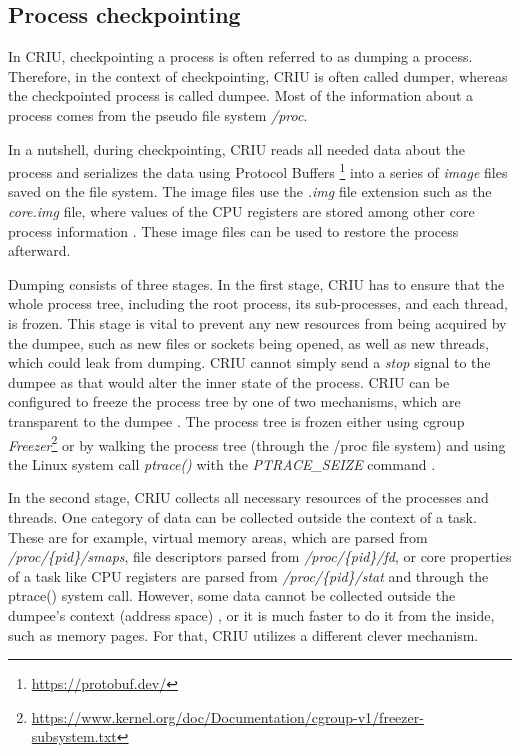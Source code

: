 \documentclass[
  digital,     %
  oneside,     %
  nosansbold,  %
  nocolorbold, %
  lof,         %
  lot,         %
]{fithesis4}
\begin{document}
\subsection{Process checkpointing}
In CRIU, checkpointing a process is often referred to as dumping a process. Therefore, in the context of checkpointing, CRIU is often called dumper, whereas the checkpointed process is called dumpee. Most of the information about a process comes from the pseudo file system \emph{/proc}. 

In a nutshell, during checkpointing, CRIU reads all needed data about the process and serializes the data using Protocol Buffers \footnote{\url{https://protobuf.dev/}} into a series of \emph{image} files saved on the file system. The image files use the \emph{.img} file extension such as the \emph{core.img} file, where values of the CPU registers are stored among other core process information \cite{criu_images}. These image files can be used to restore the process afterward. 

Dumping consists of three stages. In the first stage, CRIU has to ensure that the whole process tree, including the root process, its sub-processes, and each thread, is frozen. This stage is vital to prevent any new resources from being acquired by the dumpee, such as new files or sockets being opened, as well as new threads, which could leak from dumping. CRIU cannot simply send a \emph{stop} signal to the dumpee as that would alter the inner state of the process. CRIU can be configured to freeze the process tree by one of two mechanisms, which are transparent to the dumpee \cite{criu_freezing}. The process tree is frozen either using cgroup \emph{Freezer}\footnote{\url{https://www.kernel.org/doc/Documentation/cgroup-v1/freezer-subsystem.txt}} or by walking the process tree (through the /proc file system) and using the Linux system call \emph{ptrace()} with the \emph{PTRACE\_SEIZE} command \cite{criu_cr}.

In the second stage, CRIU collects all necessary resources of the processes and threads. One category of data can be collected outside the context of a task. These are for example, virtual memory areas, which are parsed from \emph{/proc/\{pid\}/smaps}, file descriptors parsed from \emph{/proc/\{pid\}/fd}, or core properties of a task like CPU registers are parsed from \emph{/proc/\{pid\}/stat} and through the ptrace() system call. However, some data cannot be collected outside the dumpee's context (address space) \cite{criu_cr}, or it is much faster to do it from the inside, such as memory pages. For that, CRIU utilizes a different clever mechanism.
\end{document}

